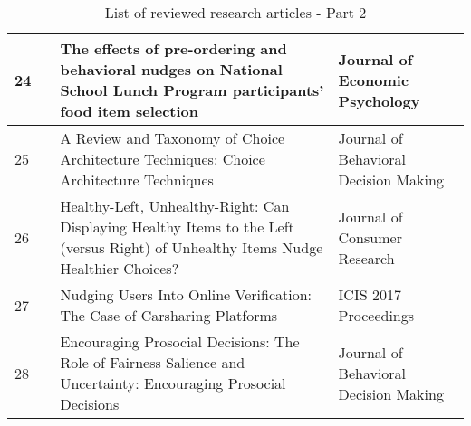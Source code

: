 \begin{table}[h!]
\begin{tabular}{|l|p{}|p{}|p{}|}
24 & \cite{miller_effects_2016} & The effects of pre-ordering and behavioral nudges on National School Lunch Program participants’ food item selection & Journal of Economic Psychology \\ \hline
25 & \cite{munscher_review_2016} & A Review and Taxonomy of Choice Architecture Techniques: Choice Architecture Techniques & Journal of Behavioral Decision Making \\ \hline
26 & \cite{romero_healthy-left_2016} & Healthy-Left, Unhealthy-Right: Can Displaying Healthy Items to the Left (versus Right) of Unhealthy Items Nudge Healthier Choices? & Journal of Consumer Research \\ \hline
27 & \cite{schneider_nudging_2017} & Nudging Users Into Online Verification: The Case of Carsharing Platforms & ICIS 2017 Proceedings \\ \hline
28 & \cite{sleesman_encouraging_2017} & Encouraging Prosocial Decisions: The Role of Fairness Salience and Uncertainty: Encouraging Prosocial Decisions & Journal of Behavioral Decision Making \\ \hline
\end{tabular}
\caption{List of reviewed research articles - Part 2}
\label{table:articles-2}
\end{table}

\newpage

